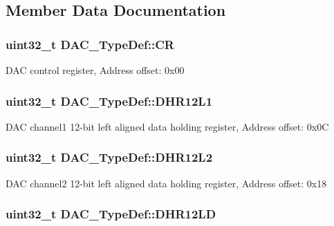 \subsection{Member Data Documentation}
\hypertarget{struct_d_a_c___type_def_a394324f0b573837ca15a87127b2a37ea}{
\subsubsection[{C\-R}]{ uint32\-\_\-t D\-A\-C\-\_\-\-Type\-Def\-::\-C\-R}}\label{struct_d_a_c___type_def_a394324f0b573837ca15a87127b2a37ea}
D\-A\-C control register, Address offset\-: 0x00 \hypertarget{struct_d_a_c___type_def_a5eb63912e39085e3e13d64bdb0cf38bd}{
\subsubsection[{D\-H\-R12\-L1}]{ uint32\-\_\-t D\-A\-C\-\_\-\-Type\-Def\-::\-D\-H\-R12\-L1}}\label{struct_d_a_c___type_def_a5eb63912e39085e3e13d64bdb0cf38bd}
D\-A\-C channel1 12-\/bit left aligned data holding register, Address offset\-: 0x0\-C \hypertarget{struct_d_a_c___type_def_a9f612b6b3e065e810e5a2fb254d6a40b}{
\subsubsection[{D\-H\-R12\-L2}]{ uint32\-\_\-t D\-A\-C\-\_\-\-Type\-Def\-::\-D\-H\-R12\-L2}}\label{struct_d_a_c___type_def_a9f612b6b3e065e810e5a2fb254d6a40b}
D\-A\-C channel2 12-\/bit left aligned data holding register, Address offset\-: 0x18 \hypertarget{struct_d_a_c___type_def_aea4d055e3697999b44cdcf2702d79d40}{
\subsubsection[{D\-H\-R12\-L\-D}]{ uint32\-\_\-t D\-A\-C\-\_\-\-Type\-Def\-::\-D\-H\-R12\-L\-D}}\label{struct_d_a_c___type_def_aea4d055e3697999b44cdcf2702d79d40}
